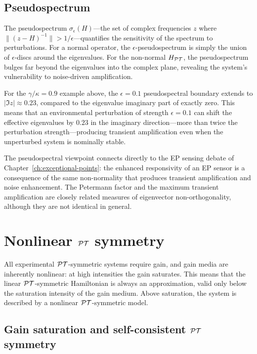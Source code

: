 \subsection{Pseudospectrum}
\label{ssec:pt-pseudospectrum}

The pseudospectrum $\sigma_\epsilon(H)$---the set of complex frequencies
$z$ where $\|(z - H)^{-1}\| > 1/\epsilon$---quantifies the sensitivity
of the spectrum to perturbations. For a normal operator, the
$\epsilon$-pseudospectrum is simply the union of $\epsilon$-discs around
the eigenvalues. For the non-normal $H_{\mathcal{PT}}$, the pseudospectrum
bulges far beyond the eigenvalues into the complex plane, revealing
the system's vulnerability to noise-driven amplification.

For the $\gamma/\kappa = 0.9$ example above, the $\epsilon = 0.1$
pseudospectral boundary extends to $|\Im z| \approx 0.23$, compared to
the eigenvalue imaginary part of exactly zero. This means that an
environmental perturbation of strength $\epsilon = 0.1$ can shift the
effective eigenvalues by $0.23$ in the imaginary direction---more than
twice the perturbation strength---producing transient amplification even
when the unperturbed system is nominally stable.

The pseudospectral viewpoint connects directly to the EP sensing debate
of Chapter~\ref{ch:exceptional-points}: the enhanced responsivity of an
EP sensor is a consequence of the same non-normality that produces
transient amplification and noise enhancement. The Petermann factor
and the maximum transient amplification are closely related measures of
eigenvector non-orthogonality, although they are not identical in
general.


\section{Nonlinear $\mathcal{PT}$ symmetry}
\label{sec:pt-nonlinear}

All experimental $\mathcal{PT}$-symmetric systems require gain, and gain media
are inherently nonlinear: at high intensities the gain saturates. This
means that the linear $\mathcal{PT}$-symmetric Hamiltonian is always an
approximation, valid only below the saturation intensity of the gain
medium. Above saturation, the system is described by a nonlinear
$\mathcal{PT}$-symmetric model.

\subsection{Gain saturation and self-consistent $\mathcal{PT}$ symmetry}
\label{ssec:pt-saturation}

